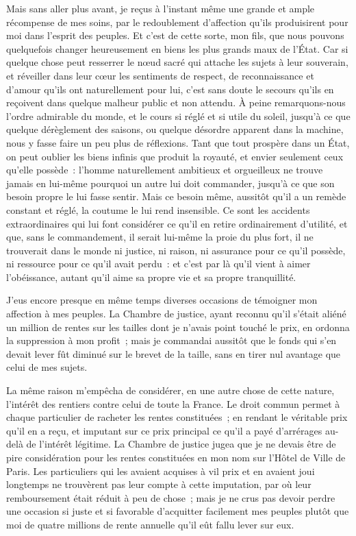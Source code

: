 \documentclass[french,twoside]{book} %
\begin{document}
Mais sans aller plus avant, je reçus à l’instant même une grande et ample récompense de mes soins, par le redoublement d’affection qu’ils produisirent pour moi dans l’esprit des peuples. Et c’est de cette sorte, mon fils, que nous pouvons quelquefois changer heureusement en biens les plus grands maux de l’État. Car si quelque chose peut resserrer le nœud sacré qui attache les sujets à leur souverain, et réveiller dans leur cœur les sentiments de respect, de reconnaissance et d’amour qu’ils ont naturellement pour lui, c’est sans doute le secours qu’ils en reçoivent dans quelque malheur public et non attendu. À peine remarquons-nous l’ordre admirable du monde, et le cours si réglé et si utile du soleil, jusqu’à ce que quelque dérèglement des saisons, ou quelque désordre apparent dans la machine, nous y fasse faire un peu plus de réflexions. Tant que tout prospère dans un État, on peut oublier les biens infinis que produit la royauté, et envier seulement ceux qu’elle possède : l’homme naturellement ambitieux et orgueilleux ne trouve jamais en lui-même pourquoi un autre lui doit commander, jusqu’à ce que son besoin propre le lui fasse sentir. Mais ce besoin même, aussitôt qu’il a un remède constant et réglé, la coutume le lui rend insensible. Ce sont les accidents extraordinaires qui lui font considérer ce qu’il en retire ordinairement d’utilité, et que, sans le commandement, il serait lui-même la proie du plus fort, il ne trouverait dans le monde ni justice, ni raison, ni assurance pour ce qu’il possède, ni ressource pour ce qu’il avait perdu : et c’est par là qu’il vient à aimer l’obéissance, autant qu’il aime sa propre vie et sa propre tranquillité.\par
J’eus encore presque en même temps diverses occasions de témoigner mon affection à mes peuples. La Chambre de justice, ayant reconnu qu’il s’était aliéné un million de rentes sur les tailles dont je n’avais point touché le prix, en ordonna la suppression à mon profit ; mais je commandai aussitôt que le fonds qui s’en devait lever fût diminué sur le brevet de la taille, sans en tirer nul avantage que celui de mes sujets.\par
La même raison m’empêcha de considérer, en une autre chose de cette nature, l’intérêt des rentiers contre celui de toute la France. Le droit commun permet à chaque particulier de racheter les rentes constituées ; en rendant le véritable prix qu’il en a reçu, et imputant sur ce prix principal ce qu’il a payé d’arrérages au-delà de l’intérêt légitime. La Chambre de justice jugea que je ne devais être de pire considération pour les rentes constituées en mon nom sur l’Hôtel de Ville de Paris. Les particuliers qui les avaient acquises à vil prix et en avaient joui longtemps ne trouvèrent pas leur compte à cette imputation, par où leur remboursement était réduit à peu de chose ; mais je ne crus pas devoir perdre une occasion si juste et si favorable d’acquitter facilement mes peuples plutôt que moi de quatre millions de rente annuelle qu’il eût fallu lever sur eux.\par
\end{document}
